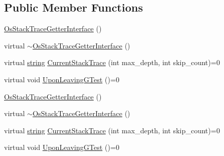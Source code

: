 \subsection*{Public Member Functions}
\begin{DoxyCompactItemize}
\item 
\hyperlink{classtesting_1_1internal_1_1_os_stack_trace_getter_interface_afbe9eb0ca8775fbb98ff0720011b6708}{Os\-Stack\-Trace\-Getter\-Interface} ()
\item 
virtual \hyperlink{classtesting_1_1internal_1_1_os_stack_trace_getter_interface_a193f4a1de4af9b78010c659912df5a15}{$\sim$\-Os\-Stack\-Trace\-Getter\-Interface} ()
\item 
virtual \hyperlink{namespacetesting_1_1internal_a5ca8a348395a6145775c1a2334e21889}{string} \hyperlink{classtesting_1_1internal_1_1_os_stack_trace_getter_interface_a6965eadb9b340808718fab9f1475c49a}{Current\-Stack\-Trace} (int max\-\_\-depth, int skip\-\_\-count)=0
\item 
virtual void \hyperlink{classtesting_1_1internal_1_1_os_stack_trace_getter_interface_a791bd120428b5a53d5eeba1b27296a39}{Upon\-Leaving\-G\-Test} ()=0
\item 
\hyperlink{classtesting_1_1internal_1_1_os_stack_trace_getter_interface_afbe9eb0ca8775fbb98ff0720011b6708}{Os\-Stack\-Trace\-Getter\-Interface} ()
\item 
virtual \hyperlink{classtesting_1_1internal_1_1_os_stack_trace_getter_interface_a193f4a1de4af9b78010c659912df5a15}{$\sim$\-Os\-Stack\-Trace\-Getter\-Interface} ()
\item 
virtual \hyperlink{namespacetesting_1_1internal_a5ca8a348395a6145775c1a2334e21889}{string} \hyperlink{classtesting_1_1internal_1_1_os_stack_trace_getter_interface_a6965eadb9b340808718fab9f1475c49a}{Current\-Stack\-Trace} (int max\-\_\-depth, int skip\-\_\-count)=0
\item 
virtual void \hyperlink{classtesting_1_1internal_1_1_os_stack_trace_getter_interface_a791bd120428b5a53d5eeba1b27296a39}{Upon\-Leaving\-G\-Test} ()=0
\end{DoxyCompactItemize}


